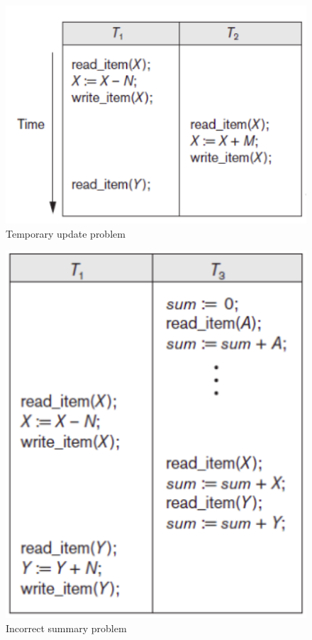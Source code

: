 \newpage
\begin{appendices}
\begin{figure}[!h]
    \centering
    \includegraphics[width=12cm]{image/temporary_update_problem.png}
    \caption{Temporary update problem}
    \label{fig:temporary_update_problem}
\end{figure}
\begin{figure}[!h]
    \centering
    \includegraphics[width=12cm]{image/incorrect_summary_problem.png}
    \caption{Incorrect summary problem}
    \label{fig:incorrect_summary_problem}
\end{figure}
\end{appendices}
